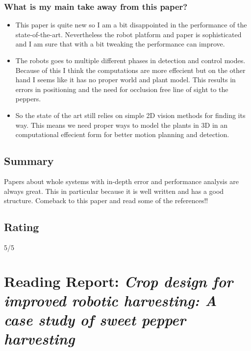 \documentclass{article}
\begin{document}
\subsubsection*{What is my main take away from this paper?}
\begin{itemize}
    \item This paper is quite new so I am a bit disappointed in the performance of the state-of-the-art.
    Nevertheless the robot platform and paper is sophisticated and I am sure that with a bit tweaking the performance can improve.
    \item The robots goes to multiple different phases in detection and control modes. Because of this I think the 
    computations are more effecient but on the other hand I seems like it has no proper world and plant model. 
    This results in errors in positioning and the need for occlusion free line of sight to the peppers. 
    \item So the state of the art still relies on simple 2D vision methods for finding its way.  
    This means we need proper ways to model the plants in 3D in an computational effecient form for better motion planning and detection.
\end{itemize}

\subsection*{Summary}
Papers about whole systems with in-depth error and performance analysis are always great. This in particular because it is well written and has a good structure. 
Comeback to this paper and read some of the references!!

\subsection*{Rating}
5/5





\section{Reading Report: \emph{Crop design for improved robotic harvesting: A case study of sweet pepper harvesting}}
\cite{Herck2020}
\end{document}
